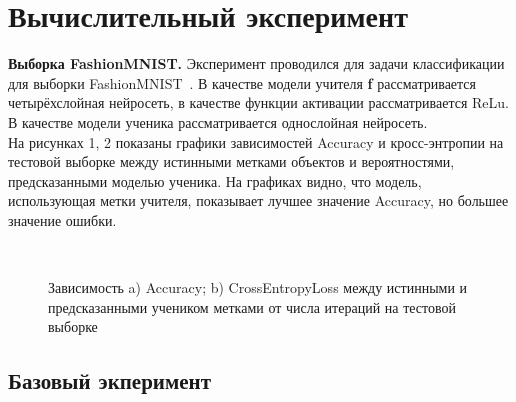 \newpage

\section{Вычислительный эксперимент}

\textbf{Выборка FashionMNIST.} Эксперимент проводился для задачи классификации для выборки FashionMNIST~\cite{FMNIST}. В качестве модели учителя \textbf{f} рассматривается четырёхслойная нейросеть, в качестве функции активации рассматривается ReLu. В качестве модели ученика рассматривается однослойная нейросеть.\\
На рисунках 1, 2 показаны графики зависимостей Accuracy и кросс-энтропии на тестовой выборке между истинными метками объектов и вероятностями, предсказанными моделью ученика. На графиках видно, что модель, использующая метки учителя, показывает лучшее значение Accuracy, но большее значение ошибки.

\begin{figure}[h!t]\center
{}
\\
\caption{Зависимость a) Accuracy; b) CrossEntropyLoss между истинными и предсказанными учеником метками от числа итераций на тестовой выборке}
\end{figure}


\newpage
\subsection{Базовый экперимент}
